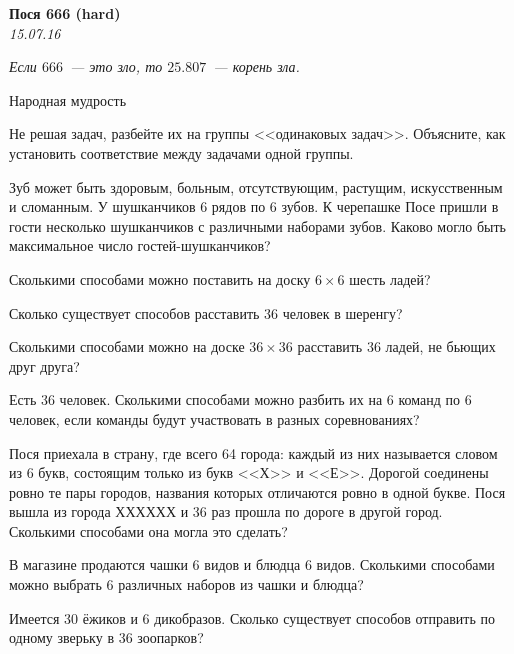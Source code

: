 \begin{center}
\textbf{\Large Пося 666 (hard)}\\
\textit{15.07.16}
\end{center}

\epigraph{\it Если $666$~--- это зло, то $25.807$~--- корень зла.}{Народная мудрость}

Не решая задач, разбейте их на группы <<одинаковых задач>>. Объясните, как установить соответствие между задачами одной группы.

\begin{problems}

\item Зуб может быть здоровым, больным, отсутствующим, растущим, искусственным и сломанным. У шушканчиков 6 рядов по 6 зубов. К черепашке Посе пришли в гости несколько шушканчиков с различными наборами зубов. Каково могло быть максимальное число гостей-шушканчиков? %

\item Сколькими способами можно поставить на доску $6\times6$ шесть ладей? %

\item Сколько существует способов расставить 36 человек в шеренгу? %

\item Сколькими способами можно на доске $36\times36$  расставить 36 ладей, не бьющих друг друга? %

\item Есть 36 человек. Сколькими способами можно разбить их на 6 команд по 6 человек, если команды будут участвовать в разных соревнованиях? %

\item Пося приехала в страну, где всего 64 города: каждый из них называется словом из 6 букв, состоящим только из букв <<Х>> и <<Е>>. Дорогой соединены ровно те пары городов, названия которых отличаются ровно в одной букве. Пося вышла из города ХХХХХХ и 36 раз прошла по дороге в другой город. Сколькими способами она могла это сделать? %

\item В магазине продаются чашки 6 видов и блюдца 6 видов. Сколькими способами можно выбрать 6 различных наборов из чашки и блюдца? %

\item Имеется 30 ёжиков и 6 дикобразов. Сколько существует способов отправить по одному зверьку в 36 зоопарков? %


\end{problems}
